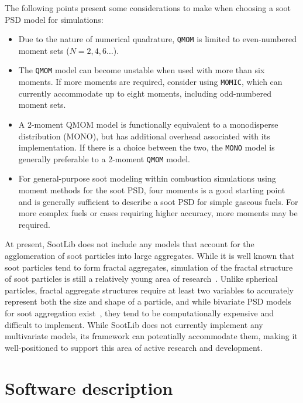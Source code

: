 \documentclass[preprint,letterpaper]{elsarticle}
\begin{document}
The following points present some considerations to make when choosing a soot PSD model for simulations:
\begin{itemize}
    \item Due to the nature of numerical quadrature, \texttt{QMOM} is limited to even-numbered moment sets ($N=2,4,6\ldots$).
    \item The \texttt{QMOM} model can become unstable when used with more than six moments. If more moments are required, consider using \texttt{MOMIC}, which can currently accommodate up to eight moments, including odd-numbered moment sets.
    \item A 2-moment QMOM model is functionally equivalent to a monodisperse distribution (MONO), but has additional overhead associated with its implementation. If there is a choice between the two, the \texttt{MONO} model is generally preferable to a 2-moment \texttt{QMOM} model.
    \item For general-purpose soot modeling within combustion simulations using moment methods for the soot PSD, four moments is a good starting point and is generally sufficient to describe a soot PSD for simple gaseous fuels. For more complex fuels or cases requiring higher accuracy, more moments may be required.
\end{itemize}

At present, SootLib does not include any models that account for the agglomeration of soot particles into large aggregates. While it is well known that soot particles tend to form fractal aggregates, simulation of the fractal structure of soot particles is still a relatively young area of research~\cite{Patterson_2007}. Unlike spherical particles, fractal aggregate structures require at least two variables to accurately represent both the size and shape of a particle, and while bivariate PSD models for soot aggregation exist~\cite{Wright_2001,Mueller_2009,Blanquart_2009c}, they tend to be computationally expensive and difficult to implement. While SootLib does not currently implement any multivariate models, its framework can potentially accommodate them, making it well-positioned to support this area of active research and development.


\section{Software description}
\label{s:architecture}
\end{document}
